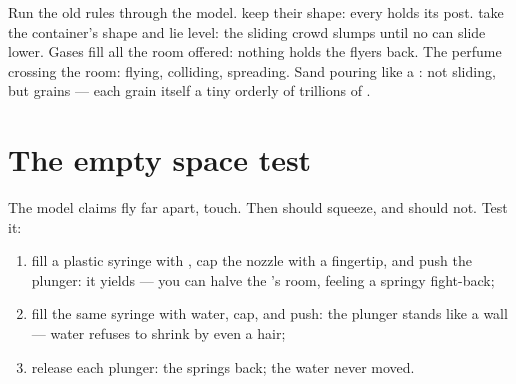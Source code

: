 \begin{example}\label{ex:g7:states-of-matter:rules}
Run the old rules through the model.  keep their shape:
every  holds its post.  take the container's shape
and lie level: the sliding crowd slumps until no  can
slide lower. Gases fill all the room offered: nothing holds the
flyers back. The perfume crossing the room:   flying,
colliding, spreading. Sand pouring like a : not 
sliding, but grains --- each grain itself a tiny orderly  of
trillions of .
\end{example}

\section{The empty space test}

\begin{method}\label{met:g7:states-of-matter:syringe}
The model claims   fly far apart,  
touch. Then  should squeeze, and  should not. Test it:
\begin{enumerate}
  \item fill a plastic syringe with , cap the nozzle with a
        fingertip, and push the plunger: it yields --- you can
        halve the 's room, feeling a springy fight-back;
  \item fill the same syringe with water, cap, and push: the
        plunger stands like a wall --- water refuses to shrink by
        even a hair;
  \item release each plunger: the  springs back; the water
        never moved.
\end{enumerate}
\end{method}

